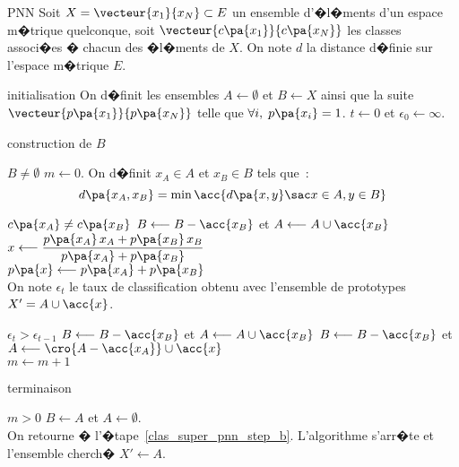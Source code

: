         \begin{xalgorithm}{PNN}\label{clas_super_algorithme_pnn_choice}
        Soit $X = \vecteur{x_1}{x_N} \subset E$ un ensemble d'�l�ments d'un espace m�trique quelconque, 
        soit $\vecteur{c\pa{x_1}}{c\pa{x_N}}$ les classes associ�es � chacun des �l�ments de $X$. On note 
        $d$ la distance d�finie sur l'espace m�trique $E$. 
        
        \begin{xalgostep}{initialisation}
        On d�finit les ensembles $A \longleftarrow \emptyset$ et $B \longleftarrow X$ ainsi que la suite
        $\vecteur{p\pa{x_1}}{p\pa{x_N}}$ telle que $\forall i, \; p\pa{x_i} = 1$. 
        $t\longleftarrow 0$ et $\epsilon_0 \longleftarrow \infty$.
        \end{xalgostep}
        
        \begin{xalgostep}{construction de $B$}\label{clas_super_pnn_step_b}
        \begin{xwhile}{$B \neq \emptyset$}
            $m \longleftarrow 0$.    On d�finit $x_A \in A$ et $x_B \in B$ tels que~: 
                        $$d\pa{x_A,x_B} = \min \acc{d\pa{x,y} \sac x \in A, y \in B}$$
            \begin{xif}{$c\pa{x_A} \neq c\pa{x_B}$}
                    $B \longleftarrow B - \acc{x_B}$ et $A \longleftarrow A \cup \acc{x_B}$
            \xelse
                    $x \longleftarrow \dfrac{ p\pa{x_A} \,x_A + p\pa{x_B} \,x_B }{ p\pa{x_A} + p\pa{x_B}}$ \\
                    $p\pa{x} \longleftarrow p\pa{x_A} + p\pa{x_B}$ \\
                    On note $\epsilon_t$ le taux de classification obtenu avec l'ensemble de prototypes
                    $X' = A \cup \acc{ x }$. \\
                    \begin{xif}{$\epsilon_t > \epsilon_{t-1}$}
                        $B \longleftarrow B - \acc{x_B}$ et $A \longleftarrow A \cup \acc{x_B}$
                    \xelse
                        $B \longleftarrow B - \acc{x_B}$ et $A \longleftarrow \cro{ A - \acc{x_A}} \cup \acc{ x }$     \\
                        $m \longleftarrow m + 1$
                    \end{xif}
            \end{xif}
        \end{xwhile}
        \end{xalgostep}
        
        \begin{xalgostep}{terminaison}
        \begin{xif}{$ m > 0 $}
            $B \longleftarrow A$ et $A  \longleftarrow \emptyset$. \\
            On retourne � l'�tape~\ref{clas_super_pnn_step_b}.
        \xelse
            L'algorithme s'arr�te et l'ensemble cherch� $X' \longleftarrow A$.
        \end{xif}
        \end{xalgostep}

        \end{xalgorithm}

